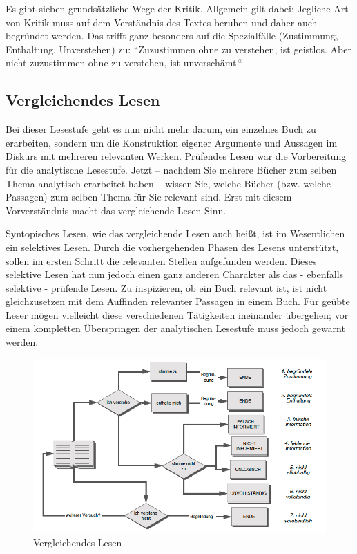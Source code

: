 \documentclass[]{book}
\theoremstyle{definition}
\theoremstyle{definition}
\theoremstyle{definition}
\theoremstyle{remark}
\begin{document}
Es gibt sieben grundsätzliche Wege der Kritik. Allgemein gilt dabei:
Jegliche Art von Kritik muss auf dem Verständnis des Textes beruhen und
daher auch begründet werden. Das trifft ganz besonders auf die
Spezialfälle (Zustimmung, Enthaltung, Unverstehen) zu: ``Zuzustimmen
ohne zu verstehen, ist geistlos. Aber nicht zuzustimmen ohne zu
verstehen, ist unverschämt.`` \citep[p 143]{Adler_Doren_1972}

\subsection{Vergleichendes Lesen}\label{vergleichendes-lesen}

Bei dieser Lesestufe geht es nun nicht mehr darum, ein einzelnes Buch zu
erarbeiten, sondern um die Konstruktion eigener Argumente und Aussagen
im Diskurs mit mehreren relevanten Werken. Prüfendes Lesen war die
Vorbereitung für die analytische Lesestufe. Jetzt -- nachdem Sie mehrere
Bücher zum selben Thema analytisch erarbeitet haben -- wissen Sie,
welche Bücher (bzw. welche Passagen) zum selben Thema für Sie relevant
sind. Erst mit diesem Vorverständnis macht das vergleichende Lesen Sinn.

Syntopisches Lesen, wie das vergleichende Lesen auch heißt, ist im
Wesentlichen ein selektives Lesen. Durch die vorhergehenden Phasen des
Lesens unterstützt, sollen im ersten Schritt die relevanten Stellen
aufgefunden werden. Dieses selektive Lesen hat nun jedoch einen ganz
anderen Charakter als das - ebenfalls selektive - prüfende Lesen. Zu
inspizieren, ob ein Buch relevant ist, ist nicht gleichzusetzen mit dem
Auffinden relevanter Passagen in einem Buch. Für geübte Leser mögen
vielleicht diese verschiedenen Tätigkeiten ineinander übergehen; vor
einem kompletten Überspringen der analytischen Lesestufe muss jedoch
gewarnt werden.

\begin{figure}

{\centering \includegraphics{images/lesen-vergleichendes-min} 

}

\caption{Vergleichendes Lesen}\label{fig:unnamed-chunk-18}
\end{figure}
\end{document}
